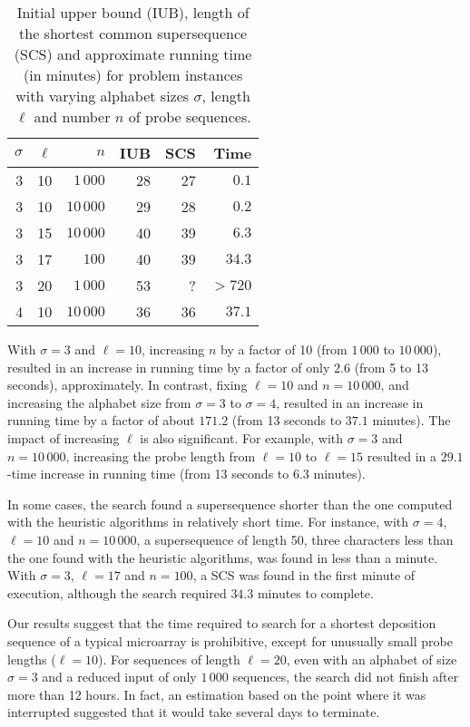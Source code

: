 \begin{table}[t!]\centering
\caption{\label{tab:scs}
  Initial upper bound (IUB), length of the shortest common supersequence (SCS)
  and approximate running time (in minutes) for problem instances with varying
  alphabet sizes $\sigma$, length $\ell$ and number $n$ of probe sequences.}
\footnotesize{
\begin{tabular}{rrrrrr}
$\sigma$ & $\ell$ &       $n$ & IUB & SCS &    Time \\ \hline
       3 &     10 &  $1\,000$ &  28 &  27 &   $0.1$ \\
       3 &     10 & $10\,000$ &  29 &  28 &   $0.2$ \\ 
       3 &     15 & $10\,000$ &  40 &  39 &   $6.3$ \\
       3 &     17 &     $100$ &  40 &  39 &  $34.3$ \\
       3 &     20 &  $1\,000$ &  53 &   ? & $> 720$ \\
       4 &     10 & $10\,000$ &  36 &  36 &  $37.1$ \\ \hline
\end{tabular}}
\end{table}

With $\sigma = 3$ and $\ell = 10$, increasing $n$ by a factor of 10 (from
$1\,000$ to $10\,000$), resulted in an increase in running time by a factor of
only $2.6$ (from 5 to 13 seconds), approximately. In contrast, fixing
$\ell = 10$ and $n = 10\,000$, and increasing the alphabet size from $\sigma = 3$
to $\sigma = 4$, resulted in an increase in running time by a factor of about
$171.2$ (from 13 seconds to $37.1$ minutes). The impact of increasing $\ell$ is
also significant. For example, with $\sigma = 3$ and $n = 10\,000$, increasing
the probe length from $\ell=10$ to $\ell = 15$ resulted in a $29.1$-time
increase in running time (from 13 seconds to $6.3$ minutes).

In some cases, the search found a supersequence shorter than the one computed
with the heuristic algorithms in relatively short time. For instance, with
$\sigma = 4$, $\ell = 10$ and $n=10\,000$, a supersequence of length 50, three
characters less than the one found with the heuristic algorithms, was found in
less than a minute. With $\sigma = 3$, $\ell = 17$ and $n=100$, a SCS was
found in the first minute of execution, although the search required $34.3$
minutes to complete.

Our results suggest that the time required to search for a shortest
deposition sequence of a typical microarray is prohibitive, except for unusually
small probe lengths ($\ell = 10$). For sequences of length $\ell = 20$, even
with an alphabet of size $\sigma = 3$ and a reduced input of only $1\,000$
sequences, the search did not finish after more than 12 hours. In fact, an
estimation based on the point where it was interrupted suggested that it would
take several days to terminate.

